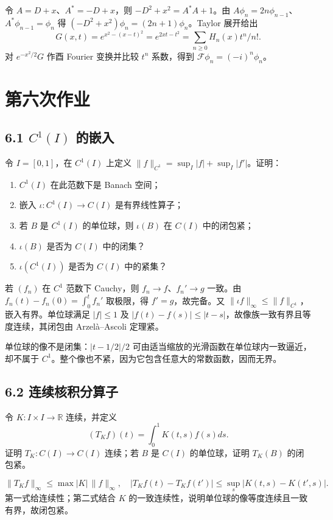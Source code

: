 令 $A=D+x$、$A^*=-D+x$，则 $-D^2+x^2=A^*A+1$。由
$A\phi_n=2n\phi_{n-1}$、$A^*\phi_{n-1}=\phi_n$ 得
$(-D^2+x^2)\phi_n=(2n+1)\phi_n$。Taylor 展开给出
\[
G(x,t)=e^{x^2-(x-t)^2}=e^{2xt-t^2}=\sum_{n\ge0}H_n(x)t^n/n!.
\]
对 $e^{-x^2/2}G$ 作酉 Fourier 变换并比较 $t^n$ 系数，得到
$\mathcal F\phi_n=(-i)^n\phi_n$。

\section{第六次作业}

\subsection*{6.1 $C^1(I)$ 的嵌入}
\begin{problem}
令 $I=[0,1]$，在 $C^1(I)$ 上定义
$\|f\|_{C^1}=\sup_I|f|+\sup_I|f'|$。证明：
\begin{enumerate}[label=(\arabic*)]
\item $C^1(I)$ 在此范数下是 Banach 空间；
\item 嵌入 $\iota:C^1(I)\to C(I)$ 是有界线性算子；
\item 若 $B$ 是 $C^1(I)$ 的单位球，则 $\iota(B)$ 在 $C(I)$ 中的闭包紧；
\item $\iota(B)$ 是否为 $C(I)$ 中的闭集？
\item $\iota(C^1(I))$ 是否为 $C(I)$ 中的紧集？
\end{enumerate}
\end{problem}
若 $(f_n)$ 在 $C^1$ 范数下 Cauchy，则 $f_n\to f$、$f_n'\to g$ 一致。由
$f_n(t)-f_n(0)=\int_0^tf_n'$ 取极限，得 $f'=g$，故完备。又
$\|\iota f\|_\infty\le\|f\|_{C^1}$，嵌入有界。单位球满足 $|f|\le1$ 及
$|f(t)-f(s)|\le|t-s|$，故像族一致有界且等度连续，其闭包由 Arzelà--Ascoli 定理紧。

单位球的像不是闭集：$|t-1/2|/2$ 可由适当缩放的光滑函数在单位球内一致逼近，却不属于 $C^1$。整个像也不紧，因为它包含任意大的常数函数，因而无界。

\subsection*{6.2 连续核积分算子}
\begin{problem}
令 $K:I\times I\to\mathbb R$ 连续，并定义
\[
(T_Kf)(t)=\int_0^1K(t,s)f(s)ds.
\]
证明 $T_K:C(I)\to C(I)$ 连续；若 $B$ 是 $C(I)$ 的单位球，证明 $T_K(B)$ 的闭包紧。
\end{problem}
\[
\|T_Kf\|_\infty\le\max|K|\,\|f\|_\infty,
\quad |T_Kf(t)-T_Kf(t')|\le\sup_s|K(t,s)-K(t',s)|.
\]
第一式给连续性；第二式结合 $K$ 的一致连续性，说明单位球的像等度连续且一致有界，故闭包紧。

